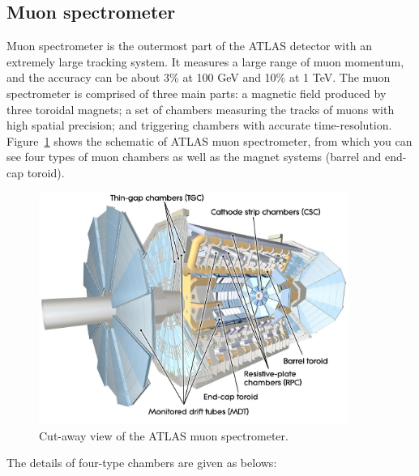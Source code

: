 \subsection{Muon spectrometer}

Muon spectrometer is the outermost part of the ATLAS detector with an extremely large tracking system.
It measures a large range of muon momentum, and the accuracy can be about 3\% at 100 GeV and 10\% at 1 TeV.
The muon spectrometer is comprised of three main parts: a magnetic field produced by three toroidal magnets;
a set of chambers measuring the tracks of muons with high spatial precision; and triggering chambers with accurate time-resolution. 
Figure~\ref{fig:muon_dec} shows the schematic of ATLAS muon spectrometer, from which you can see four types of muon chambers as well as the magnet systems (barrel and end-cap toroid).
\begin{figure}[!htb]
  \centering
  \includegraphics[width=0.9\textwidth]{figures/Detector/muon_all.png}
  \caption{Cut-away view of the ATLAS muon spectrometer\cite{Sliwa:2013oua}.}
  \label{fig:muon_dec}
\end{figure}
The details of four-type chambers are given as belows:
